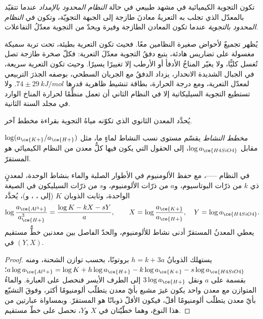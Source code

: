 \begin{definition}\label{def:b3:water-rock-interaction:regimes}
تكون التجوية الكيميائية في مشهد طبيعي في حالة
\emph{النظام المحدود بالإمداد} عندما تتقيّد بالمعدّل الذي تجلب به التعريةُ
معادنَ طازجة إلى الجبهة التجويّة، وتكون في
\emph{النظام المحدود بالتجوية} عندما تكون المعادن الطازجة وفيرة
ويحدّ من التجوية معدّلُ التفاعلات.
\end{definition}

يُظهر تجميعٌ لأحواض صغيرة النظامين معًا. فحيث تكون التعرية بطيئة، تحت تربة سميكة مغسولة
على تضاريس هادئة، يتبع دفقُ التجوية
معدّلَ التعرية: فكلّ صخرة طازجة تصل تُغسل كليًّا، ولا يغيّر المناخُ الأدفأ أو
الأرطب إلا تغييرًا يسيرًا. وحيث تكون التعرية سريعة، في الجبال الشديدة الانحدار، يزداد
الدفقُ مع الجريان السطحي، بوصفه الجذرَ التربيعي لمعدّل التعرية،
ومع درجة الحرارة، بطاقة تنشيط ظاهرية قدرها $74 \pm
\qty{29}{kJ/mol}$. ولا تستطيع التجوية السيليكاتية إلا في النظام الثاني أن تعمل
منظِّمًا لحرارة المناخ الوارد في مجلد السنة الثانية.

يُحدَّد المعدن الثانوي الذي تكوّنه مياهُ التجوية
بقراءة مخطط آخر.

\begin{definition}\label{def:b3:water-rock-interaction:activity-diagram}
\emph{مخطط النشاط} يقسّم مستوى نسب النشاط
لماءٍ ما، مثل
$\log(a_{\ce{K+}}/a_{\ce{H+}})$ مقابل $\log a_{\ce{H4SiO4}}$، إلى
الحقول التي يكون فيها كلُّ معدن من النظام الكيميائي هو المستقرّ.
\end{definition}

\begin{proposition}\label{prop:b3:water-rock-interaction:boundaries}
في النظام ------، مع حفظ الألومنيوم في الأطوار الصلبة
والماء بنشاط الوحدة، لمعدنٍ ذي $k$ من ذرّات البوتاسيوم، و$a$ من ذرّات الألومنيوم،
و$s$ من ذرّات السيليكون في الصيغة الواحدة، وثابت الذوبان $K$ (إلى
، ، و)، يُحدَّد
\[
\log\frac{a_{\ce{Al^3+}}}{a_{\ce{H+}}^3} = \frac{\log K - kX - sY}{a},
\qquad X = \log\frac{a_{\ce{K+}}}{a_{\ce{H+}}},\quad Y = \log a_{\ce{H4SiO4}}.
\]
يعطي المعدنُ المستقرّ أدنى نشاط للألومنيوم، والحدّ الفاصل
بين معدنين خطٌّ مستقيم في $(Y, X)$.
\end{proposition}

\begin{proof}
يستهلك الذوبانُ $h = k + 3a$ بروتونًا، بحسب توازن الشحنة، ومنه $a\log
a_{\ce{Al^3+}} = \log K + h\log a_{\ce{H+}} - k\log a_{\ce{K+}} - s\log
a_{\ce{H4SiO4}}$؛ بقسمة على $a$ ونقل $3\log a_{\ce{H+}}$ إلى الطرف الأيسر
فنحصل على العبارة. والماءُ المتوازن مع معدن واحد يكون
غيرَ مشبع بأيّ معدن يتطلّب ألومنيومًا أكثر، وفوقَ التشبّع
بأيّ معدن يتطلّب ألومنيومًا أقلّ، فيكون الأقلّ ذوبانًا هو
المستقرّ. وبمساواة عبارتين من هذا النوع، وهما خطّيّتان في $X$ و$Y$، نحصل على خطّ مستقيم.
\end{proof}

